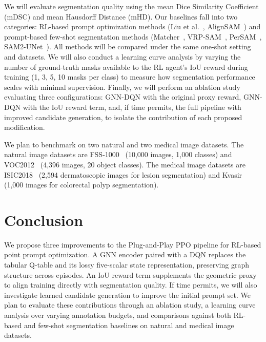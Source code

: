 \documentclass[conference]{IEEEtran}
\begin{document}
We will evaluate segmentation quality using the mean Dice Similarity Coefficient (mDSC) and mean Hausdorff Distance (mHD). Our baselines fall into two categories: RL-based prompt optimization methods (Liu et al.~\cite{Liu2025PPO}, AlignSAM~\cite{Huang2024AlignSAM}) and prompt-based few-shot segmentation methods (Matcher~\cite{Liu2023Matcher}, VRP-SAM~\cite{Sun2024VRPSAM}, PerSAM~\cite{Zhang2023PerSAM}, SAM2-UNet~\cite{Xiong2024SAM2UNet}). All methods will be compared under the same one-shot setting and datasets. We will also conduct a learning curve analysis by varying the number of ground-truth masks available to the RL agent's IoU reward during training (1, 3, 5, 10 masks per class) to measure how segmentation performance scales with minimal supervision. Finally, we will perform an ablation study evaluating three configurations: GNN-DQN with the original proxy reward, GNN-DQN with the IoU reward term, and, if time permits, the full pipeline with improved candidate generation, to isolate the contribution of each proposed modification.

We plan to benchmark on two natural and two medical image datasets. The natural image datasets are FSS-1000~\cite{Li2020FSS1000} (10,000 images, 1,000 classes) and VOC2012~\cite{Shetty2016PascalVOC} (4,396 images, 20 object classes). The medical image datasets are ISIC2018~\cite{Codella2019ISIC} (2,594 dermatoscopic images for lesion segmentation) and Kvasir~\cite{Jha2020KvasirSEG} (1,000 images for colorectal polyp segmentation).

\section{Conclusion}

We propose three improvements to the Plug-and-Play PPO pipeline for RL-based point prompt optimization. A GNN encoder paired with a DQN replaces the tabular Q-table and its lossy five-scalar state representation, preserving graph structure across episodes. An IoU reward term supplements the geometric proxy to align training directly with segmentation quality. If time permits, we will also investigate learned candidate generation to improve the initial prompt set. We plan to evaluate these contributions through an ablation study, a learning curve analysis over varying annotation budgets, and comparisons against both RL-based and few-shot segmentation baselines on natural and medical image datasets.



\end{document}
